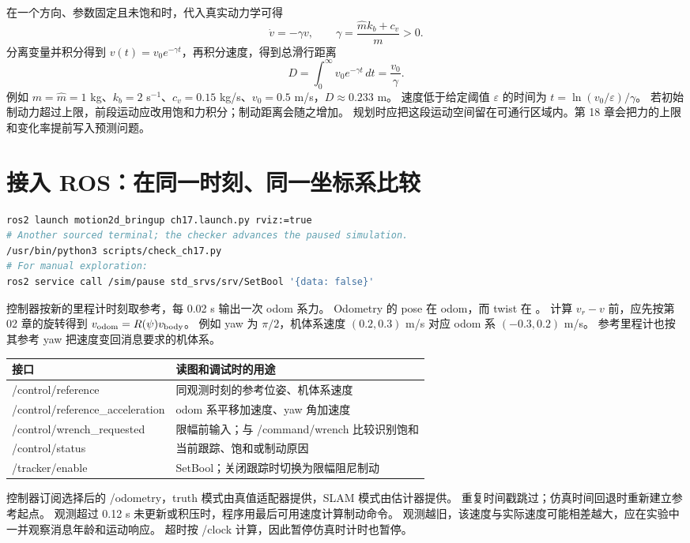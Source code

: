 在一个方向、参数固定且未饱和时，代入真实动力学可得
\[
 \dot v=-\gamma v,\qquad \gamma=\frac{\hat m k_b+c_v}{m}>0.
\]
分离变量并积分得到 $v(t)=v_0e^{-\gamma t}$，再积分速度，得到总滑行距离
\[
 D=\int_0^\infty v_0e^{-\gamma t}\,dt=\frac{v_0}{\gamma}.
\]
例如 $m=\hat m=1$ kg、$k_b=2$ s$^{-1}$、$c_v=0.15$ kg/s、$v_0=0.5$ m/s，$D\approx0.233$ m。
速度低于给定阈值 $\varepsilon$ 的时间为 $t=\ln(v_0/\varepsilon)/\gamma$。
若初始制动力超过上限，前段运动应改用饱和力积分；制动距离会随之增加。
规划时应把这段运动空间留在可通行区域内。第 18 章会把力的上限和变化率提前写入预测问题。

\section{接入 ROS：在同一时刻、同一坐标系比较}
\begin{lstlisting}[language=bash,numbers=none]
ros2 launch motion2d_bringup ch17.launch.py rviz:=true
# Another sourced terminal; the checker advances the paused simulation.
/usr/bin/python3 scripts/check_ch17.py
# For manual exploration:
ros2 service call /sim/pause std_srvs/srv/SetBool '{data: false}'
\end{lstlisting}
控制器按新的里程计时刻取参考，每 0.02 s 输出一次 odom 系力。
Odometry 的 pose 在 odom，而 twist 在 。
计算 $v_r-v$ 前，应先按第 02 章的旋转得到 $v_{\rm odom}=R(\psi)v_{\rm body}$。
例如 yaw 为 $\pi/2$，机体系速度 $(0.2,0.3)$ m/s 对应 odom 系 $(-0.3,0.2)$ m/s。
参考里程计也按其参考 yaw 把速度变回消息要求的机体系。

\begin{center}\small
\begin{tabular}{lp{8.0cm}}\toprule
接口 & 读图和调试时的用途\\\midrule
/control/reference & 同观测时刻的参考位姿、机体系速度\\
/control/reference\_acceleration & odom 系平移加速度、yaw 角加速度\\
/control/wrench\_requested & 限幅前输入；与 /command/wrench 比较识别饱和\\
/control/status & 当前跟踪、饱和或制动原因\\
/tracker/enable & SetBool；关闭跟踪时切换为限幅阻尼制动\\\bottomrule
\end{tabular}
\end{center}
控制器订阅选择后的 /odometry，truth 模式由真值适配器提供，SLAM 模式由估计器提供。
重复时间戳跳过；仿真时间回退时重新建立参考起点。
观测超过 0.12 s 未更新或积压时，程序用最后可用速度计算制动命令。
观测越旧，该速度与实际速度可能相差越大，应在实验中一并观察消息年龄和运动响应。
超时按 /clock 计算，因此暂停仿真时计时也暂停。

